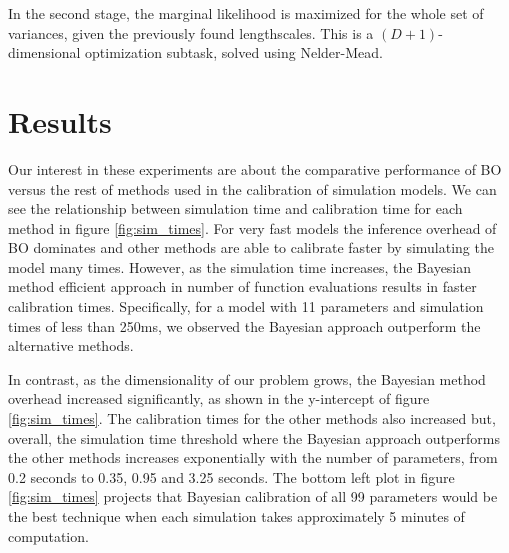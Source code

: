 \documentclass{IOS-Book-Article}
\begin{document}
	In the second stage, the marginal likelihood is maximized for the whole set of variances, given the previously found lengthscales. This is a $(D+1)$-dimensional optimization subtask, solved using Nelder-Mead\cite{nelder-mead}.
	
	\section{Results}
	
	
	Our interest in these experiments are about the comparative performance of BO versus the rest of methods used in the calibration of simulation models. We can see the relationship between simulation time and calibration time for each method in figure \ref{fig:sim_times}. For very fast models the inference overhead of BO dominates and other methods are able to calibrate faster by simulating the model many times. However, as the simulation time increases, the Bayesian method efficient approach in number of function evaluations results in faster calibration times. Specifically, for a model with 11 parameters and simulation times of less than 250ms, we observed the Bayesian approach outperform the alternative methods.
	
	In contrast, as the dimensionality of our problem grows, the Bayesian method overhead increased significantly, as shown in the y-intercept of figure \ref{fig:sim_times}. The calibration times for the other methods also increased but, overall, the simulation time threshold where the Bayesian approach outperforms the other methods increases exponentially with the number of parameters, from 0.2 seconds to 0.35, 0.95 and 3.25 seconds. The bottom left plot in figure \ref{fig:sim_times} projects that Bayesian calibration of all 99 parameters would be the best technique when each simulation takes approximately 5 minutes of computation.
	
\end{document}
